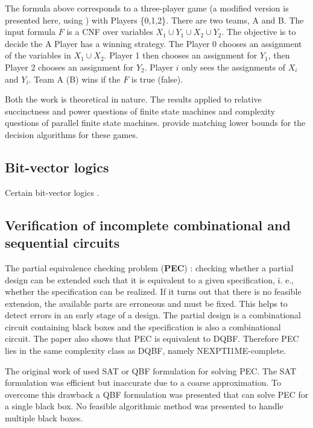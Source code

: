 \documentclass[runningheads]{llncs}
\begin{document}
The formula above corresponds to a three-player game (a modified version is presented here, using \cite{hearn06}) with Players \{0,1,2\}.
There are two teams, A and B.
The input formula $F$ is a CNF over variables $X_1 \cup Y_1 \cup X_2 \cup Y_2$.
The objective is to decide the A Player has a winning strategy.
The Player 0 chooses an assignment of the variables in $X_1 \cup X_2$.
Player 1 then chooses an assignment for $Y_1$, then Player 2 chooses an assignment for $Y_2$.
Player $i$ only sees the assignments of $X_i$ and $Y_i$. Team A (B) wins if the $F$ is true (false).

Both the work \cite{petersonr79, peterson2001lower} is theoretical in nature. The results applied to relative succinctness and power questions of finite state machines and complexity questions of parallel finite state machines.
\cite{peterson2001lower} provide matching lower bounds for the decision algorithms for these games.

\subsection{Bit-vector logics}\label{subsec:bitvectors}
Certain bit-vector logics \cite{kovasznaifb12, wintersteigerhm13}.

\subsection{Verification of incomplete combinational and sequential circuits}\label{subsec:pec}

The partial equivalence checking problem (\textbf{PEC}) \cite{gitinarswb13r}: checking whether a partial design can be extended
such that it is equivalent to a given specification, i. e., whether the specification can be realized.
If it turns out that there is no feasible extension, the available parts are erroneous and must be fixed. This helps to detect errors in an early stage of a design.
The partial design is a combinational circuit containing
black boxes and the specification is also a combinational circuit.
The paper also shows that PEC is equivalent to DQBF. Therefore PEC lies in the same complexity class as DQBF, namely NEXPTI1ME-complete.

The original work of \cite{schollb01} used SAT or QBF formulation for solving PEC. The SAT formulation was
efficient but inaccurate due to a coarse
approximation. 
To overcome this drawback a QBF formulation was presented that can solve PEC for a single black box. 
No feasible algorithmic method was presented to handle multiple black boxes.
\end{document}
